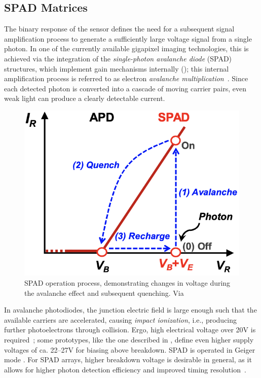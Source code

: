 \subsection{SPAD Matrices}

The binary response of the sensor defines the need for a subsequent signal amplification process to generate a sufficiently large voltage signal from a single photon. In one of the currently available gigapixel imaging technologies, this is achieved via the integration of the \textit{single-photon avalanche diode} (SPAD) structures, which implement gain mechanisms internally (\cite{Saleh1991}); this internal amplification process is referred to as electron \textit{avalanche multiplication}~\cite{Ma:17}. Since each detected photon is converted into a cascade of moving carrier pairs, even weak light can produce a clearly detectable current. %

\begin{figure}[h]
  \centering
  \includegraphics[width=0.8\linewidth]{imgs/avalanche.png}
  \caption{SPAD operation process, demonstrating changes in voltage during the avalanche effect and subsequent quenching. Via \cite{Charbon2018}}
  \label{fig:avalanche}
\end{figure}

In avalanche photodiodes, the junction electric field is large enough such that the available carriers are accelerated, causing \textit{impact ionization}, i.e., producing further photoelectrons through collision. Ergo, high electrical voltage over 20V is required~\cite{Gnanasambandam_2019}; some prototypes, like the one described in \cite{rng16}, define even higher supply voltages of ca. 22–27V for biasing above breakdown. SPAD is operated in Geiger mode \cite{7117471}. For SPAD arrays, higher breakdown voltage is desirable in general, as it allows for higher photon detection efficiency and improved timing resolution~\cite{7117471}.

